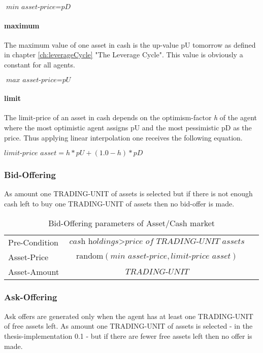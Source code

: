 \documentclass[Bachelorarbeit.tex]{subfiles}
\begin{document}
\begin{center}
$\textit{min asset-price} = \textit{pD}$
\end{center}
 
\paragraph{maximum}
The maximum value of one asset in cash is the up-value pU tomorrow as defined in chapter \ref{ch:leverageCycle} "The Leverage Cycle". This value is obviously a constant for all agents.

\begin{center}
$\textit{max asset-price} = \textit{pU}$
\end{center}

\paragraph{limit}
The limit-price of an asset in cash depends on the optimism-factor \textit{h} of the agent where the most optimistic agent assigns pU and the most pessimistic pD as the price. Thus applying linear interpolation one receives the following equation.

\begin{center}
$\textit{limit-price asset} = h * pU + ( 1.0 - h ) * pD$
\end{center}

\subsubsection{Bid-Offering}
As amount one TRADING-UNIT of assets is selected but if there is not enough cash left to buy one TRADING-UNIT of assets then no bid-offer is made.

\begin{table}[H]
	\centering
	\caption{Bid-Offering parameters of Asset/Cash market}
	\begin{tabular} { l c r }
		\hline
		Pre-Condition & $\textit{cash holdings} > \textit{price of TRADING-UNIT assets}$  \\
		Asset-Price & $\mathrm{random}(\textit{min asset-price}, \textit{limit-price asset})$ \\
		Asset-Amount & $\textit{TRADING-UNIT}$ \\
		\hline
	\end{tabular}
\end{table}

\subsubsection{Ask-Offering}
Ask offers are generated only when the agent has at least one TRADING-UNIT of free assets left. As amount one TRADING-UNIT of assets is selected - in the thesis-implementation 0.1 - but if there are fewer free assets left then no offer is made.
\end{document}
